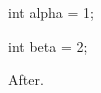 \documentclass{article}
\begin{document}
\begin{mybox}
int alpha = 1;
\end{mybox}
\begin{exbox}
int beta = 2;
\end{exbox}
After.
\end{document}
